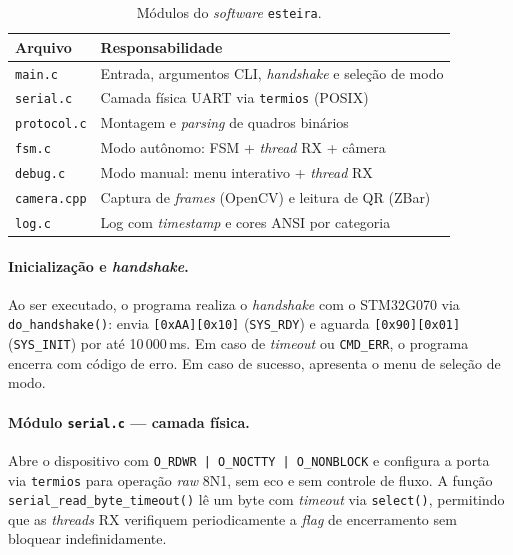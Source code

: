 \begin{table}[!htpb]
\renewcommand{\arraystretch}{1.1}
\caption{Módulos do \textit{software} \texttt{esteira}.}
\label{tab:modulos_gui_c}
\centering
\footnotesize
\begin{tabular}{p{2.0cm}p{5.2cm}}
\hline
\textbf{Arquivo} & \textbf{Responsabilidade} \\
\hline
\texttt{main.c}     & Entrada, argumentos CLI, \textit{handshake} e seleção de modo \\
\texttt{serial.c}   & Camada física UART via \texttt{termios} (POSIX) \\
\texttt{protocol.c} & Montagem e \textit{parsing} de quadros binários \\
\texttt{fsm.c}      & Modo autônomo: FSM + \textit{thread} RX + câmera \\
\texttt{debug.c}    & Modo manual: menu interativo + \textit{thread} RX \\
\texttt{camera.cpp} & Captura de \textit{frames} (OpenCV) e leitura de QR (ZBar) \\
\texttt{log.c}      & Log com \textit{timestamp} e cores ANSI por categoria \\
\hline
\end{tabular}
\end{table}

\paragraph{Inicialização e \textit{handshake}.}
Ao ser executado, o programa realiza o \textit{handshake} com o STM32G070
via \texttt{do\_handshake()}: envia \texttt{[0xAA][0x10]} (\texttt{SYS\_RDY})
e aguarda \texttt{[0x90][0x01]} (\texttt{SYS\_INIT}) por até 10\,000\,ms.
Em caso de \textit{timeout} ou \texttt{CMD\_ERR}, o programa encerra com
código de erro. Em caso de sucesso, apresenta o menu de seleção de modo.

\paragraph{Módulo \texttt{serial.c} — camada física.}
Abre o dispositivo com \texttt{O\_RDWR | O\_NOCTTY | O\_NONBLOCK} e
configura a porta via \texttt{termios} para operação \textit{raw} 8N1,
sem eco e sem controle de fluxo. A função
\texttt{serial\_read\_byte\_timeout()} lê um byte com \textit{timeout} via
\texttt{select()}, permitindo que as \textit{threads} RX verifiquem
periodicamente a \textit{flag} de encerramento sem bloquear
indefinidamente.

